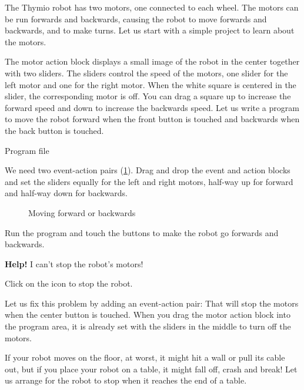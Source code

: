 
\label{c.moving}


The Thymio robot has two motors, one connected to each wheel. The
motors can be run forwards and backwards, causing the robot to move
forwards and backwards, and to make turns. Let us start with a simple
project to learn about the motors.

The motor action block  displays a small image of the
robot in the center together with two sliders. The sliders control the
speed of the motors, one slider for the left motor and one for the right
motor. When the white square is centered in the slider, the
corresponding motor is off. You can drag a square up to increase the
forward speed and down to increase the backwards speed.
Let us write a program to move the robot forward when the front button
is touched and backwards when the back button is touched.

{\raggedleft \hfill Program file }

We need two event-action pairs (\cref{fig.nostop}). Drag and drop
the event and action blocks and set the sliders equally for the left and
right motors, half-way up for forward and half-way down for backwards.

\begin{figure}
\begin{center}
\caption{Moving forward or backwards}\label{fig.nostop}
\end{center}
\end{figure}

Run the program and touch the buttons to
make the robot go forwards and backwards.

\newpage


\textbf{Help!} I can't stop the robot's motors!

Click on the icon  to stop the robot.

Let us fix this problem by adding an event-action pair: 
That will stop the motors when the center button is touched. When you
drag the motor action block into the program area, it is already set
with the sliders in the middle to turn off the motors.


If your robot moves on the floor, at worst, it might hit a wall or pull
its cable out, but if you place your robot on a table, it might fall
off, crash and break! Let us arrange for the robot to stop when it
reaches the end of a table.

